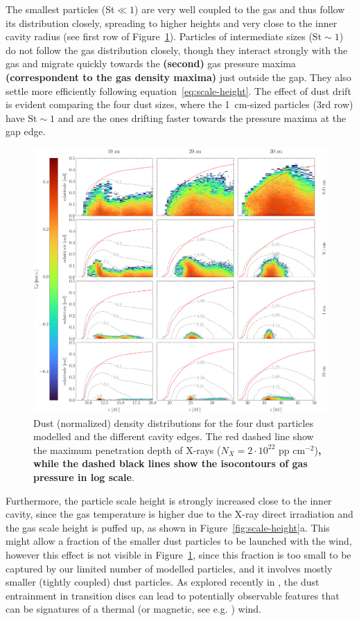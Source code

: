 \documentclass[fleqn,usenatbib]{mnras}
\begin{document}
        The smallest particles (St$\ll 1$) are very well coupled to the gas and thus follow its distribution closely, spreading to higher heights and very close to the inner cavity radius (see first row of Figure~\ref{fig:GasDustDist}).
        Particles of intermediate sizes ($\mathrm{St} \sim 1$) do not follow the gas distribution closely, though they interact strongly with the gas and migrate quickly towards the \textbf{(second)} gas pressure maxima \textbf{(correspondent to the gas density maxima)} just outside the gap.
        They also settle more efficiently following equation~\ref{eq:scale-height}.
        The effect of dust drift is evident comparing the four dust sizes, where the \SI{1}{cm}-sized particles (3rd row) have $\mathrm{St} \sim 1$ and are the ones drifting faster towards the pressure maxima at the gap edge.
        \begin{figure}
            \centering
            \includegraphics[width=\textwidth]{Fig3}
            \caption{Dust (normalized) density distributions for the four dust particles modelled and the different cavity edges. The red dashed line show the maximum penetration depth of X-rays ($N_X = 2\cdot 10^{22}$ pp cm$^{-2}$)\textbf{, while the dashed black lines show the isocontours of gas pressure in log scale}.}
            \label{fig:GasDustDist}
        \end{figure}
        
        Furthermore, the particle scale height is strongly increased close to the inner cavity, since the gas temperature is higher due to the X-ray direct irradiation and the gas scale height is puffed up, as shown in Figure~\ref{fig:scale-height}a. This might allow a fraction of the smaller dust particles to be launched with the wind, however this effect is not visible in Figure~\ref{fig:GasDustDist}, since this fraction is too small to be captured by our limited number of modelled particles, and it involves mostly smaller (tightly coupled) dust particles. As explored recently in \citet{Franz2022}, the dust entrainment in transition discs can lead to potentially observable features that can be signatures of a thermal (or magnetic, see e.g. \citet{Rodenkirch2022}) wind.
\end{document}
